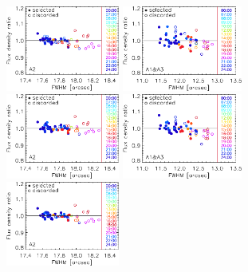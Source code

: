 \begin{figure}[ht!]
\begin{center}
    \includegraphics[clip=true, trim={0, -0.3cm, -0.3cm, 0}, width=0.3337\textwidth]{Figures/Calibration/plot_flux_density_ratio_fwhm_uranus_skydip_narrow_a2.pdf}
    \includegraphics[clip=true, trim={0, -0.3cm, -0.3cm, 0}, width=0.35\textwidth]{Figures/Calibration/plot_flux_density_ratio_fwhm_uranus_corrected_skydip_photocorr_demo_narrow_1mm.pdf}
    \includegraphics[clip=true, trim={0, -0.3cm, -0.3cm, 0}, width=0.3337\textwidth]{Figures/Calibration/plot_flux_density_ratio_fwhm_uranus_corrected_skydip_photocorr_demo_narrow_a2.pdf}
    \includegraphics[clip=true, trim={0, -0.3cm, -0.3cm, 0}, width=0.35\textwidth]{Figures/Calibration/plot_flux_density_ratio_fwhm_uranus_corrected_skydip_photocorr_pointing_narrow_1mm.pdf}
    \includegraphics[clip=true, trim={0, -0.3cm, -0.3cm, 0}, width=0.3337\textwidth]{Figures/Calibration/plot_flux_density_ratio_fwhm_uranus_corrected_skydip_photocorr_pointing_narrow_a2.pdf}

\end{center}
\end{figure}
